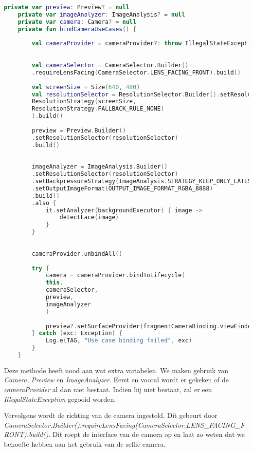\begin{lstlisting}[language=Kotlin, caption=bindCameraUseCases in CameraFragment.kt]
    private var preview: Preview? = null
    private var imageAnalyzer: ImageAnalysis? = null
    private var camera: Camera? = null
    private fun bindCameraUseCases() {
     
        val cameraProvider = cameraProvider?: throw IllegalStateException("Camera initialization failed.")
        
     
        val cameraSelector = CameraSelector.Builder()
        .requireLensFacing(CameraSelector.LENS_FACING_FRONT).build()
        
        val screenSize = Size(640, 480)
        val resolutionSelector = ResolutionSelector.Builder().setResolutionStrategy(
        ResolutionStrategy(screenSize,
        ResolutionStrategy.FALLBACK_RULE_NONE)
        ).build()
        
        preview = Preview.Builder()
        .setResolutionSelector(resolutionSelector)
        .build()
        
        
        imageAnalyzer = ImageAnalysis.Builder()
        .setResolutionSelector(resolutionSelector)
        .setBackpressureStrategy(ImageAnalysis.STRATEGY_KEEP_ONLY_LATEST)
        .setOutputImageFormat(OUTPUT_IMAGE_FORMAT_RGBA_8888)
        .build()
        .also {
            it.setAnalyzer(backgroundExecutor) { image ->
                detectFace(image)
            }
        }
        
        
        cameraProvider.unbindAll()
        
        try {
            camera = cameraProvider.bindToLifecycle(
            this,
            cameraSelector,
            preview,
            imageAnalyzer
            )
            
            preview?.setSurfaceProvider(fragmentCameraBinding.viewFinder.surfaceProvider)
        } catch (exc: Exception) {
            Log.e(TAG, "Use case binding failed", exc)
        }
    }
\end{lstlisting} 
Deze methode heeft nood aan wat extra variabelen. We maken gebruik van \emph{Camera}, \emph{Preview} en \emph{ImageAnalyzer}. Eerst en vooral wordt er gekeken of de \emph{cameraProvider} al dan niet bestaat. Indien hij niet bestaat, zal er een \emph{IllegalStateException} gegooid worden. 

Vervolgens wordt de richting van de camera ingesteld. Dit gebeurt door \emph{CameraSelector.Builder().requireLensFacing(CameraSelector.LENS\_FACING\_FRONT).build()}. Dit roept de interface van de camera op en laat zo weten dat we behoefte hebben aan het gebruik van de selfie-camera.

